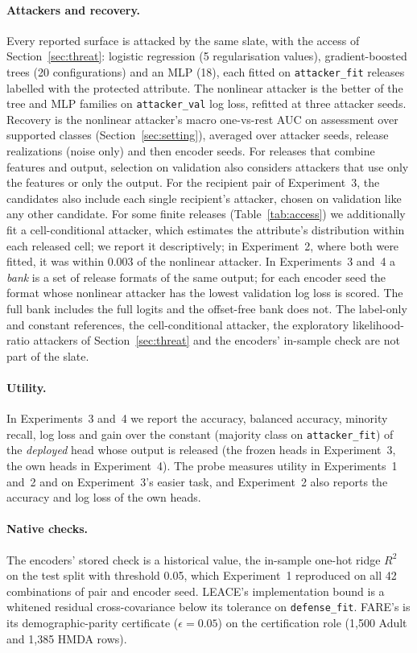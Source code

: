 \documentclass[10pt]{article}
\begin{document}
\paragraph{Attackers and recovery.} Every reported surface is attacked by the same slate, with the access of
Section~\ref{sec:threat}: logistic regression (5 regularisation values), gradient-boosted trees (20 configurations) and
an MLP (18), each fitted on \texttt{attacker\_fit} releases labelled with the protected attribute. The nonlinear
attacker is the better of the tree and MLP families on \texttt{attacker\_val} log loss, refitted at three attacker
seeds. Recovery is the nonlinear attacker's macro one-vs-rest AUC on assessment over supported classes
(Section~\ref{sec:setting}), averaged over attacker seeds, release
realizations (noise only) and then encoder seeds. For releases that combine features and output, selection on validation also considers attackers
that use only the features or only the output. For the recipient pair of Experiment~3, the candidates also include each single recipient's
attacker, chosen on validation like any other candidate. For some finite releases (Table~\ref{tab:access}) we
additionally fit a cell-conditional attacker, which estimates the attribute's distribution within each released cell;
we report it descriptively; in Experiment~2, where both were fitted, it was within 0.003 of the nonlinear attacker. In Experiments~3 and~4 a
\emph{bank} is a set of release formats of the same output; for each encoder seed the format whose nonlinear attacker
has the lowest validation log loss is scored. The full bank includes the full logits and the offset-free bank does not.
The label-only and constant references, the cell-conditional attacker, the exploratory likelihood-ratio attackers of
Section~\ref{sec:threat} and the encoders' in-sample check are not part of the slate.

\paragraph{Utility.} In Experiments~3 and~4 we report the accuracy, balanced accuracy, minority recall, log loss and gain
over the constant (majority class on \texttt{attacker\_fit}) of the \emph{deployed} head whose output is released (the frozen heads in Experiment~3, the own heads in
Experiment~4). The probe measures utility in Experiments~1 and~2 and on Experiment~3's easier task, and Experiment~2 also
reports the accuracy and log loss of the own heads.

\paragraph{Native checks.} The encoders' stored check is a historical value, the in-sample one-hot ridge $R^2$ on the
test split with threshold 0.05, which Experiment~1 reproduced on all 42 combinations of pair and encoder seed. LEACE's
implementation bound is a whitened residual cross-covariance below its tolerance on \texttt{defense\_fit}. FARE's is
its demographic-parity certificate ($\epsilon=0.05$) on the certification role (1{,}500 Adult and 1{,}385 HMDA rows).
\end{document}
